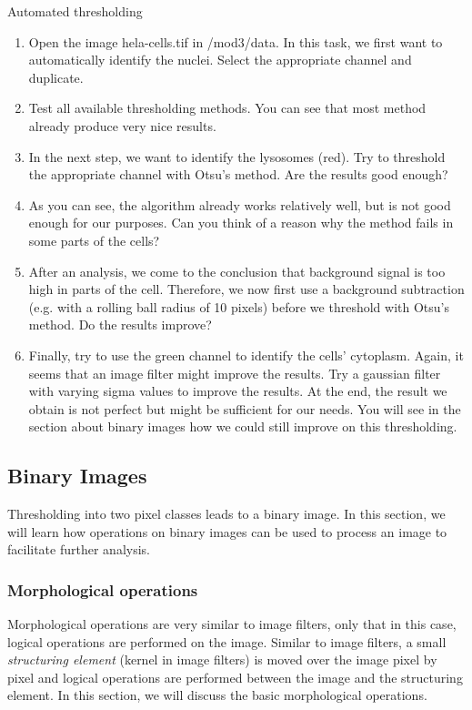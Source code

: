 \begin{taskbox}{Automated thresholding}
\begin{enumerate}
	\item Open the image hela-cells.tif in /mod3/data. In this task, we first want to automatically identify the nuclei. Select the appropriate channel and duplicate. 
	\item Test all available thresholding methods. You can see that most method already produce very nice results.
	\item In the next step, we want to identify the lysosomes (red). Try to threshold the appropriate channel with Otsu's method. Are the results good enough?
	\item As you can see, the algorithm already works relatively well, but is not good enough for our purposes. Can you think of a reason why the method fails in some parts of the cells? 
	\item After an analysis, we come to the conclusion that background signal is too high in parts of the cell. Therefore, we now first use a background subtraction (e.g. with a rolling ball radius of 10 pixels) before we threshold with Otsu's method. Do the results improve?
	\item Finally, try to use the green channel to identify the
          cells' cytoplasm. Again, it seems that an image filter might
          improve the results. Try a gaussian filter with varying
          sigma values to improve the results. At the end, the result
          we obtain is not perfect but might be sufficient for our
          needs. You will see in the section about binary images how we could still improve on this thresholding. 
	\end{enumerate}
\end{taskbox}

\subsection{Binary Images}
Thresholding into two pixel classes leads to a binary image. In this section, we will learn how operations on binary images can be used to process an image to facilitate further analysis. 

\subsubsection{Morphological operations}
Morphological operations are very similar to image filters, only that in this case, logical operations are performed on the image. Similar to image filters, a small \emph{structuring element} (kernel in image filters) is moved over the image pixel by pixel and logical operations are performed between the image and the structuring element. In this section, we will discuss the basic morphological operations.

